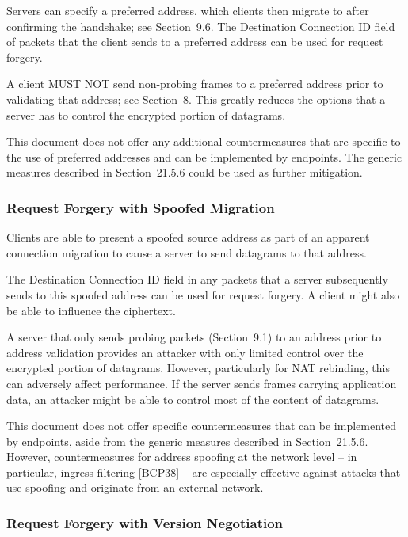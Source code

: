 \documentclass{article}
\begin{document}
Servers can specify a preferred address, which clients then migrate to after confirming the handshake; see Section~9.6.  The Destination Connection ID field of packets that the client sends to a preferred address can be used for request forgery.

A client MUST NOT send non-probing frames to a preferred address prior to validating that address; see Section~8.  This greatly reduces the options that a server has to control the encrypted portion of datagrams.

This document does not offer any additional countermeasures that are specific to the use of preferred addresses and can be implemented by endpoints.  The generic measures described in Section~21.5.6 could be used as further mitigation.

\subsubsection{Request Forgery with Spoofed Migration}

Clients are able to present a spoofed source address as part of an apparent connection migration to cause a server to send datagrams to that address.

The Destination Connection ID field in any packets that a server subsequently sends to this spoofed address can be used for request forgery.  A client might also be able to influence the ciphertext.

A server that only sends probing packets (Section~9.1) to an address prior to address validation provides an attacker with only limited control over the encrypted portion of datagrams.  However, particularly for NAT rebinding, this can adversely affect performance.  If the server sends frames carrying application data, an attacker might be able to control most of the content of datagrams.

This document does not offer specific countermeasures that can be implemented by endpoints, aside from the generic measures described in Section~21.5.6.  However, countermeasures for address spoofing at the network level -- in particular, ingress filtering [BCP38] -- are especially effective against attacks that use spoofing and originate from an external network.

\subsubsection{Request Forgery with Version Negotiation}
\end{document}
